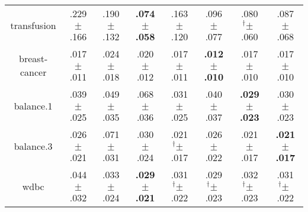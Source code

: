 \begin{tabular}{|c|ccccccc|}
transfusion & .229$^{\phantom{\dag}}\pm^{\phantom{\dag}}$.166\cellcolor{red!40} & .190$^{\phantom{\dag}}\pm^{\phantom{\dag}}$.132\cellcolor{red!19} & \textbf{.074$^{\phantom{\dag}}\pm^{\phantom{\dag}}$.058}\cellcolor{green!40} & .163$^{\phantom{\dag}}\pm^{\phantom{\dag}}$.120\cellcolor{red!5} & .096$^{\phantom{\dag}}\pm^{\phantom{\dag}}$.077\cellcolor{green!28} & .080$^{\dag}\pm^{\phantom{\dag}}$.060\cellcolor{green!36} & .087$^{\phantom{\dag}}\pm^{\phantom{\dag}}$.068\cellcolor{green!33} \\
breast-cancer & .017$^{\phantom{\dag}}\pm^{\phantom{\dag}}$.011\cellcolor{green!8} & .024$^{\phantom{\dag}}\pm^{\phantom{\dag}}$.018\cellcolor{red!40} & .020$^{\phantom{\dag}}\pm^{\phantom{\dag}}$.012\cellcolor{red!13} & .017$^{\phantom{\dag}}\pm^{\phantom{\dag}}$.011\cellcolor{green!7} & \textbf{.012$^{\phantom{\dag}}\pm^{\phantom{\dag}}$.010}\cellcolor{green!40} & .017$^{\phantom{\dag}}\pm^{\phantom{\dag}}$.010\cellcolor{green!7} & .017$^{\phantom{\dag}}\pm^{\phantom{\dag}}$.010\cellcolor{green!9} \\
balance.1 & .039$^{\phantom{\dag}}\pm^{\phantom{\dag}}$.025\cellcolor{green!20} & .049$^{\phantom{\dag}}\pm^{\phantom{\dag}}$.035\cellcolor{green!0} & .068$^{\phantom{\dag}}\pm^{\phantom{\dag}}$.036\cellcolor{red!40} & .031$^{\phantom{\dag}}\pm^{\phantom{\dag}}$.025\cellcolor{green!36} & .040$^{\phantom{\dag}}\pm^{\phantom{\dag}}$.037\cellcolor{green!16} & \textbf{.029$^{\phantom{\dag}}\pm^{\phantom{\dag}}$.023}\cellcolor{green!40} & .030$^{\phantom{\dag}}\pm^{\phantom{\dag}}$.023\cellcolor{green!39} \\
balance.3 & .026$^{\phantom{\dag}}\pm^{\phantom{\dag}}$.021\cellcolor{green!32} & .071$^{\phantom{\dag}}\pm^{\phantom{\dag}}$.031\cellcolor{red!40} & .030$^{\phantom{\dag}}\pm^{\phantom{\dag}}$.024\cellcolor{green!25} & .021$^{\dag}\pm^{\phantom{\dag}}$.017\cellcolor{green!39} & .026$^{\phantom{\dag}}\pm^{\phantom{\dag}}$.022\cellcolor{green!32} & .021$^{\phantom{\dag}}\pm^{\phantom{\dag}}$.017\cellcolor{green!39} & \textbf{.021$^{\phantom{\dag}}\pm^{\phantom{\dag}}$.017}\cellcolor{green!40} \\
wdbc & .044$^{\phantom{\dag}}\pm^{\phantom{\dag}}$.032\cellcolor{red!40} & .033$^{\phantom{\dag}}\pm^{\phantom{\dag}}$.024\cellcolor{green!16} & \textbf{.029$^{\phantom{\dag}}\pm^{\phantom{\dag}}$.021}\cellcolor{green!40} & .031$^{\dag}\pm^{\phantom{\dag}}$.022\cellcolor{green!25} & .029$^{\dag}\pm^{\phantom{\dag}}$.023\cellcolor{green!38} & .032$^{\dag}\pm^{\phantom{\dag}}$.023\cellcolor{green!23} & .031$^{\dag}\pm^{\phantom{\dag}}$.022\cellcolor{green!25} \\

\end{tabular}
